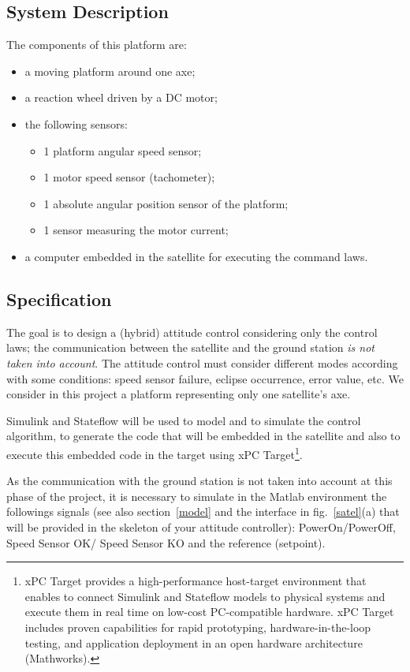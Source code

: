 \documentclass[a4paper]{article}
\begin{document}
\subsection{System Description}

The components of this platform are:
\begin{itemize}
\item a moving platform around one axe;
\item a reaction wheel driven by a DC motor;
\item the following sensors:
	\begin{itemize}
	\item 1 platform angular speed sensor;
	\item 1 motor speed sensor (tachometer);
	\item 1 absolute angular position sensor of the platform;
	\item 1 sensor measuring the motor current;
	\end{itemize}
\item a computer embedded in the satellite for executing the command laws.
\end{itemize}

\subsection{Specification}
\label{specs}

The goal is to design a (hybrid) attitude control considering only the control laws; the
communication between the satellite and the ground station \emph{is not taken into account}.
The attitude control must consider different modes according with some conditions: speed sensor
failure, eclipse occurrence, error value, etc. We consider in this project a platform representing
only one satellite's axe.

Simulink and Stateflow will be used to model and to simulate the control algorithm, 
to generate the code that will be embedded in the satellite and also to execute this 
embedded code in the target using xPC Target\footnote{xPC Target provides a high-performance 
host-target environment that enables to connect Simulink and Stateflow models to physical 
systems and execute them in real time on low-cost PC-compatible hardware. xPC Target 
includes proven capabilities for rapid prototyping, hardware-in-the-loop testing, and 
application deployment in an open hardware architecture (Mathworks).}.

As the communication with the ground station is not taken into account at this phase of 
the project, it is necessary to simulate in the Matlab environment the followings signals 
(see also section~\ref{model} and the interface in fig.~\ref{satel}(a) that will be provided in 
the skeleton of your attitude controller): PowerOn/PowerOff,  Speed Sensor OK/ Speed Sensor KO 
and the reference (setpoint).
\end{document}

